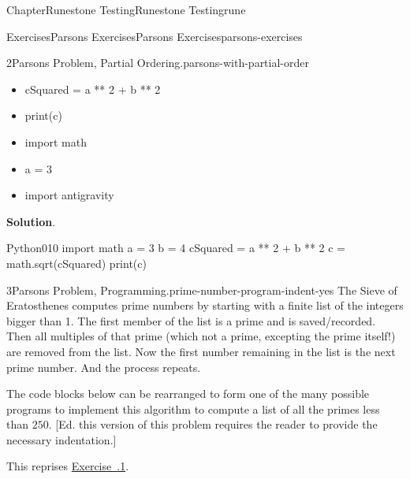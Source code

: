 \documentclass[oneside,10pt,]{book}
\newcommand{\blocktitlefont}{\relax}
\newcommand{\xreffont}{\relax}
\numberwithin{equation}{section}
\begin{document}
\begin{chapterptx}{Chapter}{Runestone Testing}{}{Runestone Testing}{}{}{rune}
\begin{exercises-section}{Exercises}{Parsons Exercises}{}{Parsons Exercises}{}{}{parsons-exercises}
\begin{divisionexercise}{2}{Parsons Problem, Partial Ordering.}{}{parsons-with-partial-order}
\begin{itemize}[label=\textbullet]
\begin{itemize}[label=]
%
\begin{codedisplay}
4 = b
\end{codedisplay}
%
\end{itemize}
%
\item{}%
\begin{codedisplayleft}
cSquared = a ** 2 + b ** 2
\end{codedisplayleft}
%
\item{}%
\begin{codedisplayleft}
print(c)
\end{codedisplayleft}
%
\item{}%
\begin{codedisplayleft}
import math
\end{codedisplayleft}
%
\item{}%
\begin{codedisplayleft}
a = 3
\end{codedisplayleft}
%
\item{}%
\begin{codedisplayleft}
import antigravity
\end{codedisplayleft}
%
\end{itemize}
%
\par\smallskip%
\noindent\textbf{\blocktitlefont Solution}.\hypertarget{parsons-with-partial-order-3}{}\quad{}\begin{program}{Python}{0}{1}{0}
import math
a = 3
b = 4
cSquared = a ** 2 + b ** 2
c = math.sqrt(cSquared)
print(c)
\end{program}
\end{divisionexercise}%
\begin{divisionexercise}{3}{Parsons Problem, Programming.}{}{prime-number-program-indent-yes}%
%
%
The Sieve of Eratosthenes computes prime numbers by starting with a finite list of the integers bigger than 1.  The first member of the list is a prime and is saved\slash{}recorded.  Then all multiples of that prime (which not a prime, excepting the prime itself!) are removed from the list.  Now the first number remaining in the list is the next prime number.  And the process repeats.%
\par
The code blocks below can be rearranged to form one of the many possible programs to implement this algorithm to compute a list of all the primes less than \(250\). [Ed. this version of this problem requires the reader to provide the necessary indentation.]%
\par
This reprises \hyperlink{sieve-primes}{Exercise~{\xreffont 2.5.1}}.%

\end{divisionexercise}
\end{exercises-section}
\end{chapterptx}
\end{document}
